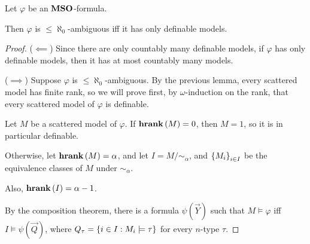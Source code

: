 \begin{lemma}
    Let $\varphi$ be an $\mathbf{MSO}$-formula.

    Then $\varphi$ is $\le \aleph_0$-ambiguous
    iff it has only definable models.
\end{lemma}

\begin{proof}
    ($\impliedby$) Since there are only countably many definable models,
    if $\varphi$ has only definable models,
    then it has at most countably many models.

    ($\implies$) Suppose $\varphi$ is $\le \aleph_0$-ambiguous.
    By the previous lemma, every scattered model has
    finite rank, so we will prove first, by $\omega$-induction
    on the rank, that every scattered model of $\varphi$ is definable.

    Let $M$ be a scattered model of $\varphi$. If $\mathbf{hrank} \left( {M} \right) = 0$,
    then $M = 1$, so it is in particular definable.

    Otherwise, let $\mathbf{hrank} \left( {M} \right) = \alpha$, and let
    $I = M / \sim_\alpha$, and $\left\{ {M_i} \right\}_{i \in I}$
    be the equivalence classes of $M$ under $\sim_\alpha$.

    Also, $\mathbf{hrank} \left( {I} \right) = \alpha - 1$.

    By the composition theorem, there is a formula
    $\psi(\vec{Y})$ such that $M \models \varphi$ iff $I \models \psi(\vec{Q})$,
    where $Q_\tau = \left\{ { i \in I : M_i \models \tau } \right\}$ for 
    every $n$-type $\tau$.

\end{proof}
